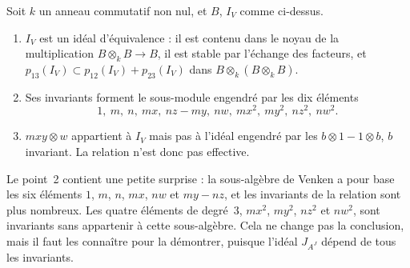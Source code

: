 \begin{encadre}
\begin{enonce}
Soit $k$ un anneau commutatif non nul, et $B$, $I_V$ comme ci-dessus.
\begin{enumerate}
\item $I_V$ est un idéal d'équivalence : il est contenu dans le noyau de la multiplication $B \otimes_k B \to B$, il est stable par l'échange des facteurs, et $p_{13}(I_V) \subset p_{12}(I_V) + p_{23}(I_V)$ dans $B \otimes_k (B \otimes_k B)$.
\item Ses invariants forment le sous-module engendré par les dix éléments
\[
  1,\ m,\ n,\ mx,\ nz - my,\ nw,\ mx^2,\ my^2,\ nz^2,\ nw^2 .
\]
\item $mxy \otimes w$ appartient à $I_V$ mais pas à l'idéal engendré par les $b \otimes 1 - 1 \otimes b$, $b$ invariant. La relation n'est donc pas effective.
\end{enumerate}
\end{enonce}
\end{encadre}

\noindent Le point~2 contient une petite surprise : la sous-algèbre de Venken a pour base les six éléments $1$, $m$, $n$, $mx$, $nw$ et $my - nz$, et les invariants de la relation sont plus nombreux. Les quatre éléments de degré~$3$, $mx^2$, $my^2$, $nz^2$ et $nw^2$, sont invariants sans appartenir à cette sous-algèbre. Cela ne change pas la conclusion, mais il faut les connaître pour la démontrer, puisque l'idéal $J_{A^J}$ dépend de tous les invariants.

